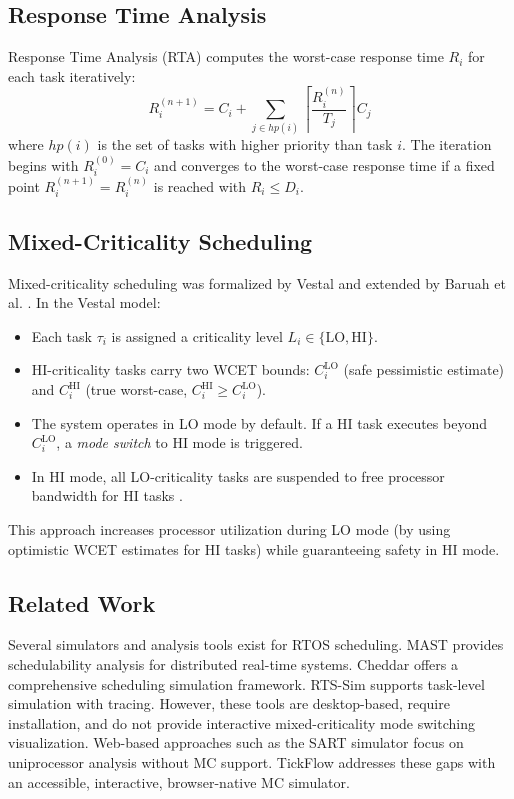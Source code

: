 \documentclass[conference]{IEEEtran}
\begin{document}
\subsection{Response Time Analysis}
Response Time Analysis (RTA) \cite{joseph1986finding, audsley1993applying} computes the worst-case response time $R_i$ for each task iteratively:
\begin{equation}
  R_i^{(n+1)} = C_i + \sum_{j \in hp(i)} \left\lceil \frac{R_i^{(n)}}{T_j} \right\rceil C_j
  \label{eq:rta}
\end{equation}
where $hp(i)$ is the set of tasks with higher priority than task $i$. The iteration begins with $R_i^{(0)} = C_i$ and converges to the worst-case response time if a fixed point $R_i^{(n+1)} = R_i^{(n)}$ is reached with $R_i \leq D_i$.

\subsection{Mixed-Criticality Scheduling}
Mixed-criticality scheduling was formalized by Vestal \cite{vestal2007preemptive} and extended by Baruah et al. \cite{baruah2011mixed}. In the Vestal model:
\begin{itemize}
  \item Each task $\tau_i$ is assigned a criticality level $L_i \in \{\text{LO}, \text{HI}\}$.
  \item HI-criticality tasks carry two WCET bounds: $C_i^{\text{LO}}$ (safe pessimistic estimate) and $C_i^{\text{HI}}$ (true worst-case, $C_i^{\text{HI}} \geq C_i^{\text{LO}}$).
  \item The system operates in LO mode by default. If a HI task executes beyond $C_i^{\text{LO}}$, a \textit{mode switch} to HI mode is triggered.
  \item In HI mode, all LO-criticality tasks are suspended to free processor bandwidth for HI tasks \cite{burns2013mixed}.
\end{itemize}
This approach increases processor utilization during LO mode (by using optimistic WCET estimates for HI tasks) while guaranteeing safety in HI mode.

\subsection{Related Work}
Several simulators and analysis tools exist for RTOS scheduling. MAST \cite{gonzalez2001mast} provides schedulability analysis for distributed real-time systems. Cheddar \cite{singhoff2004cheddar} offers a comprehensive scheduling simulation framework. RTS-Sim \cite{rtssim} supports task-level simulation with tracing. However, these tools are desktop-based, require installation, and do not provide interactive mixed-criticality mode switching visualization. Web-based approaches such as the SART simulator \cite{sart2019} focus on uniprocessor analysis without MC support. TickFlow addresses these gaps with an accessible, interactive, browser-native MC simulator.
\end{document}
